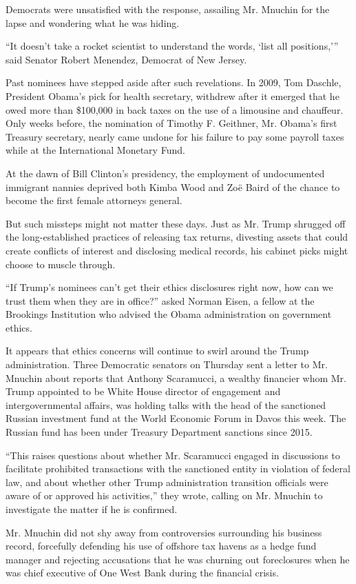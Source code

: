 Democrats were unsatisfied with the response, assailing Mr. Mnuchin for
the lapse and wondering what he was hiding.

``It doesn't take a rocket scientist to understand the words, `list all
positions,''' said Senator Robert Menendez, Democrat of New Jersey.

Past nominees have stepped aside after such revelations. In 2009, Tom
Daschle, President Obama's pick for health secretary, withdrew after it
emerged that he owed more than \$100,000 in back taxes on the use of a
limousine and chauffeur. Only weeks before, the nomination of Timothy F.
Geithner, Mr. Obama's first Treasury secretary, nearly came undone for
his failure to pay some payroll taxes while at the International
Monetary Fund.

At the dawn of Bill Clinton's presidency, the employment of undocumented
immigrant nannies deprived both Kimba Wood and Zoë Baird of the chance
to become the first female attorneys general.

But such missteps might not matter these days. Just as Mr. Trump
shrugged off the long-established practices of releasing tax returns,
divesting assets that could create conflicts of interest and disclosing
medical records, his cabinet picks might choose to muscle through.

``If Trump's nominees can't get their ethics disclosures right now, how
can we trust them when they are in office?'' asked Norman Eisen, a
fellow at the Brookings Institution who advised the Obama administration
on government ethics.

It appears that ethics concerns will continue to swirl around the Trump
administration. Three Democratic senators on Thursday sent a letter to
Mr. Mnuchin about reports that Anthony Scaramucci, a wealthy financier
whom Mr. Trump appointed to be White House director of engagement and
intergovernmental affairs, was holding talks with the head of the
sanctioned Russian investment fund at the World Economic Forum in Davos
this week. The Russian fund has been under Treasury Department sanctions
since 2015.

``This raises questions about whether Mr. Scaramucci engaged in
discussions to facilitate prohibited transactions with the sanctioned
entity in violation of federal law, and about whether other Trump
administration transition officials were aware of or approved his
activities,'' they wrote, calling on Mr. Mnuchin to investigate the
matter if he is confirmed.

Mr. Mnuchin did not shy away from controversies surrounding his business
record, forcefully defending his use of offshore tax havens as a hedge
fund manager and rejecting accusations that he was churning out
foreclosures when he was chief executive of One West Bank during the
financial crisis.

